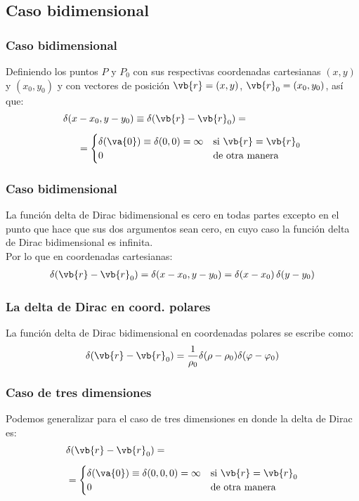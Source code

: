 \subsection{Caso bidimensional}
\begin{frame}
\frametitle{Caso bidimensional}
Definiendo los puntos $P$ y $P_{0}$ con sus respectivas coordenadas cartesianas $(x, y)$ y $(x_{0}, y_{0})$ y con vectores de posición $\vb{r} = (x, y)$, $\vb{r}_{0} = (x_{0}, y_{0})$, así que:
\begin{align*}
\delta(x &- x_{0}, y - y_{0}) \equiv \delta (\vb{r} - \vb{r}_{0}) = \\[0.5em]
&=\begin{cases}
\delta(\va{0}) \equiv \delta (0, 0) = \infty & \mbox{si } \vb{r} = \vb{r}_{0} \\
0 & \mbox{de otra manera}
\end{cases}
\end{align*}
\end{frame}
\begin{frame}
\frametitle{Caso bidimensional}
La función delta de Dirac bidimensional es cero en todas partes excepto en el punto que hace que sus dos argumentos sean cero, en cuyo caso la función delta de Dirac bidimensional es infinita.
\\
\bigskip
\pause
Por lo que en coordenadas cartesianas:
\begin{align*}
\delta(\vb{r} - \vb{r}_{0}) = \delta(x - x_{0}, y - y_{0}) = \delta(x - x_{0}) \, \delta(y - y_{0})
\end{align*}
\end{frame}
\begin{frame}
\frametitle{La delta de Dirac en coord. polares}
La función delta de Dirac bidimensional en coordenadas polares se escribe como:
\begin{align*}
\delta(\vb{r} - \vb{r}_{0}) = \dfrac{1}{\rho_{0}} \delta(\rho - \rho_{0}) \delta( \varphi - \varphi_{0})
\end{align*}
\end{frame}
\begin{frame}
\frametitle{Caso de tres dimensiones}
Podemos generalizar para el caso de tres dimensiones en donde la delta de Dirac es:
\begin{align*}
&\delta (\vb{r} - \vb{r}_{0}) = \\[0.5em]
&=\begin{cases}
\delta(\va{0}) \equiv \delta (0, 0, 0) = \infty & \mbox{si } \vb{r} = \vb{r}_{0} \\
0 & \mbox{de otra manera}
\end{cases}
\end{align*}
\end{frame}
